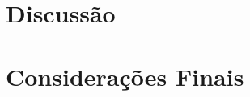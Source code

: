 \section{Discussão}
\label{sec:res_discussao}

%
%
%
%

\section{Considerações Finais}
\label{sec:res_finais}

